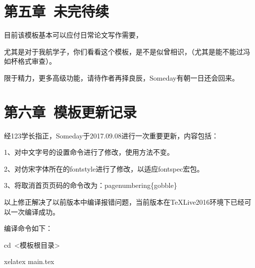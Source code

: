 \documentclass{ctexart}
\begin{document}

\clearpage

\section{第五章\ 未完待续}

目前该模板基本可以应付日常论文写作需要，\par
尤其是对于我航学子，你们看看这个模板，是不是似曾相识，（尤其是能不能过冯如杯格式审查）。\par
限于精力，更多高级功能，请待作者再择良辰，Someday有朝一日还会回来。

\section{第六章\ 模板更新记录}

经123学长指正，Someday于2017.09.08进行一次重要更新，内容包括：\par
1、对中文字号的设置命令进行了修改，使用方法不变。\par
2、对仿宋字体所在的fontstyle进行了修改，以适应fontspec宏包。\par
3、将取消首页页码的命令改为：pagenumbering\{gobble\} \par

以上修正解决了以前版本中编译报错问题，当前版本在TeXLive2016环境下已经可以一次编译成功。 \par

编译命令如下： \par
cd\ <模板根目录> \par
xelatex main.tex \par


\end{document}
